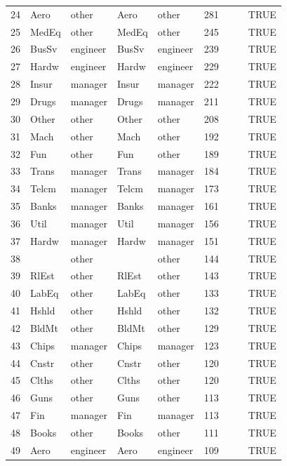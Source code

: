 \begin{table}[ht]
\begin{tabular}{rllllrrrl}
  24 & Aero & other & Aero & other & 281 &  &  & TRUE \\ 
  25 & MedEq & other & MedEq & other & 245 &  &  & TRUE \\ 
  26 & BusSv & engineer & BusSv & engineer & 239 &  &  & TRUE \\ 
  27 & Hardw & engineer & Hardw & engineer & 229 &  &  & TRUE \\ 
  28 & Insur & manager & Insur & manager & 222 &  &  & TRUE \\ 
  29 & Drugs & manager & Drugs & manager & 211 &  &  & TRUE \\ 
  30 & Other & other & Other & other & 208 &  &  & TRUE \\ 
  31 & Mach & other & Mach & other & 192 &  &  & TRUE \\ 
  32 & Fun & other & Fun & other & 189 &  &  & TRUE \\ 
  33 & Trans & manager & Trans & manager & 184 &  &  & TRUE \\ 
  34 & Telcm & manager & Telcm & manager & 173 &  &  & TRUE \\ 
  35 & Banks & manager & Banks & manager & 161 &  &  & TRUE \\ 
  36 & Util & manager & Util & manager & 156 &  &  & TRUE \\ 
  37 & Hardw & manager & Hardw & manager & 151 &  &  & TRUE \\ 
  38 &  & other &  & other & 144 &  &  & TRUE \\ 
  39 & RlEst & other & RlEst & other & 143 &  &  & TRUE \\ 
  40 & LabEq & other & LabEq & other & 133 &  &  & TRUE \\ 
  41 & Hshld & other & Hshld & other & 132 &  &  & TRUE \\ 
  42 & BldMt & other & BldMt & other & 129 &  &  & TRUE \\ 
  43 & Chips & manager & Chips & manager & 123 &  &  & TRUE \\ 
  44 & Cnstr & other & Cnstr & other & 120 &  &  & TRUE \\ 
  45 & Clths & other & Clths & other & 120 &  &  & TRUE \\ 
  46 & Guns & other & Guns & other & 113 &  &  & TRUE \\ 
  47 & Fin & manager & Fin & manager & 113 &  &  & TRUE \\ 
  48 & Books & other & Books & other & 111 &  &  & TRUE \\ 
  49 & Aero & engineer & Aero & engineer & 109 &  &  & TRUE \\ 

\end{tabular}
\end{table}
